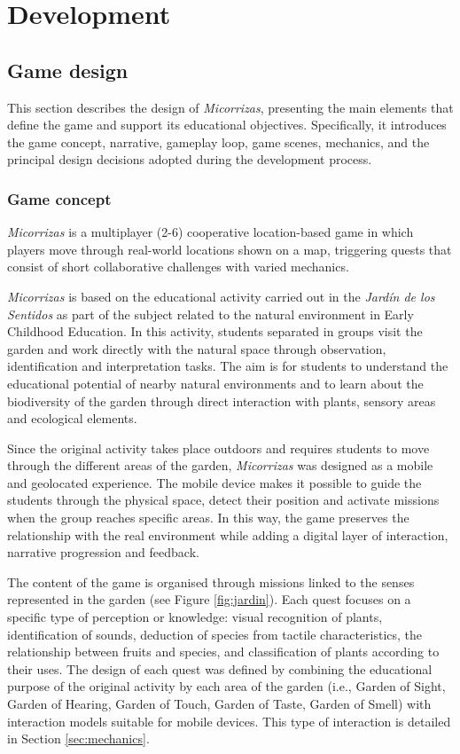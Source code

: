 \chapter{Development}

\section{Game design}
This section describes the design of \textit{Micorrizas}, presenting the main elements that define the game and support its educational objectives. Specifically, it introduces the game concept, narrative, gameplay loop, game scenes, mechanics, and the principal design decisions adopted during the development process.

\subsection{Game concept}

\textit{Micorrizas} is a multiplayer (2-6) cooperative location-based game in which players move through real-world locations shown on a map, triggering quests that consist of short collaborative challenges with varied mechanics.

\textit{Micorrizas} is based on the educational activity carried out in the \textit{Jardín de los Sentidos} as part of the subject related to the natural environment in Early Childhood Education. In this activity, students separated in groups visit the garden and work directly with the natural space through observation, identification and interpretation tasks. The aim is for students to understand the educational potential of nearby natural environments and to learn about the biodiversity of the garden through direct interaction with plants, sensory areas and ecological elements.

Since the original activity takes place outdoors and requires students to move through the different areas of the garden, \textit{Micorrizas} was designed as a mobile and geolocated experience. The mobile device makes it possible to guide the students through the physical space, detect their position and activate missions when the group reaches specific areas. In this way, the game preserves the relationship with the real environment while adding a digital layer of interaction, narrative progression and feedback.

The content of the game is organised through missions linked to the senses represented in the garden (see Figure \ref{fig:jardin}). Each quest focuses on a specific type of perception or knowledge: visual recognition of plants, identification of sounds, deduction of species from tactile characteristics, the relationship between fruits and species, and classification of plants according to their uses. The design of each quest was defined by combining the educational purpose of the original activity by each area of the garden (i.e., Garden of Sight, Garden of Hearing, Garden of Touch, Garden of Taste, Garden of Smell) with interaction models suitable for mobile devices. This type of interaction is detailed in Section \ref{sec:mechanics}.

